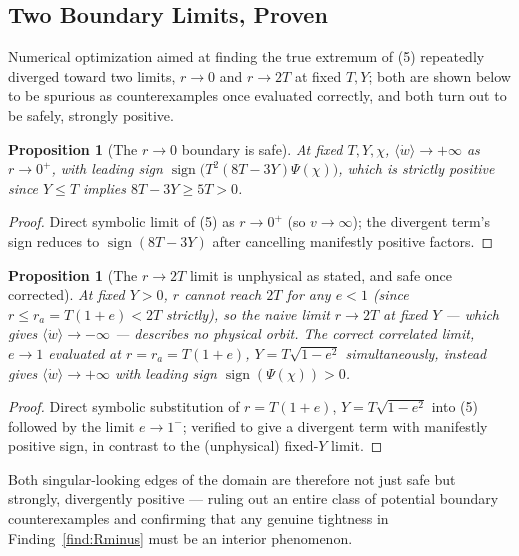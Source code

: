 \documentclass[12pt]{amsart}
\theoremstyle{plain}
\newtheorem{proposition}[theorem]{Proposition}
\theoremstyle{remark}
\begin{document}
\subsection{Two Boundary Limits, Proven}

Numerical optimization aimed at finding the true extremum of (5) repeatedly diverged toward two limits, $r\to0$ and $r\to2T$ at fixed $T,Y$; both are shown below to be spurious as counterexamples once evaluated correctly, and both turn out to be safely, strongly positive.

\begin{proposition}[The $r\to0$ boundary is safe]\label{prop:r0}
At fixed $T,Y,\chi$, $\langle\dot w\rangle\to+\infty$ as $r\to0^+$, with leading sign $\operatorname{sign}\big(T^2(8T-3Y)\Psi(\chi)\big)$, which is strictly positive since $Y\leq T$ implies $8T-3Y\geq5T>0$.
\end{proposition}

\begin{proof}
Direct symbolic limit of (5) as $r\to0^+$ (so $v\to\infty$); the divergent term's sign reduces to $\operatorname{sign}(8T-3Y)$ after cancelling manifestly positive factors.
\end{proof}

\begin{proposition}[The $r\to2T$ limit is unphysical as stated, and safe once corrected]\label{prop:r2T}
At \emph{fixed} $Y>0$, $r$ cannot reach $2T$ for any $e<1$ (since $r\leq r_a=T(1+e)<2T$ strictly), so the naive limit $r\to2T$ at fixed $Y$ --- which gives $\langle\dot w\rangle\to-\infty$ --- describes no physical orbit. The correct correlated limit, $e\to1$ evaluated at $r=r_a=T(1+e)$, $Y=T\sqrt{1-e^2}$ simultaneously, instead gives $\langle\dot w\rangle\to+\infty$ with leading sign $\operatorname{sign}(\Psi(\chi))>0$.
\end{proposition}

\begin{proof}
Direct symbolic substitution of $r=T(1+e)$, $Y=T\sqrt{1-e^2}$ into (5) followed by the limit $e\to1^-$; verified to give a divergent term with manifestly positive sign, in contrast to the (unphysical) fixed-$Y$ limit.
\end{proof}

Both singular-looking edges of the domain are therefore not just safe but strongly, divergently positive --- ruling out an entire class of potential boundary counterexamples and confirming that any genuine tightness in Finding~\ref{find:Rminus} must be an interior phenomenon.
\end{document}
